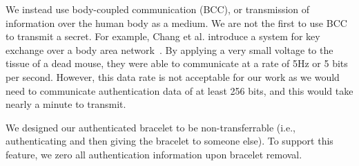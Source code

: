 We instead use body-coupled communication (BCC), or transmission of information over the human body as a medium. We are not the first to use BCC to transmit a secret. For example, Chang et al. introduce a system for key exchange over a body area network~\cite{chang:healthtech:2013}. By applying a very small voltage to the tissue of a dead mouse, they were able to communicate at a rate of 5Hz or 5 bits per second.  However, this data rate is not acceptable for our work as we would need to communicate authentication data of at least 256 bits, and this would take nearly a minute to transmit.  


We designed our authenticated bracelet to be non-transferrable (i.e., authenticating and then giving the bracelet to someone else). To support this feature, we zero all authentication information upon bracelet removal. 


